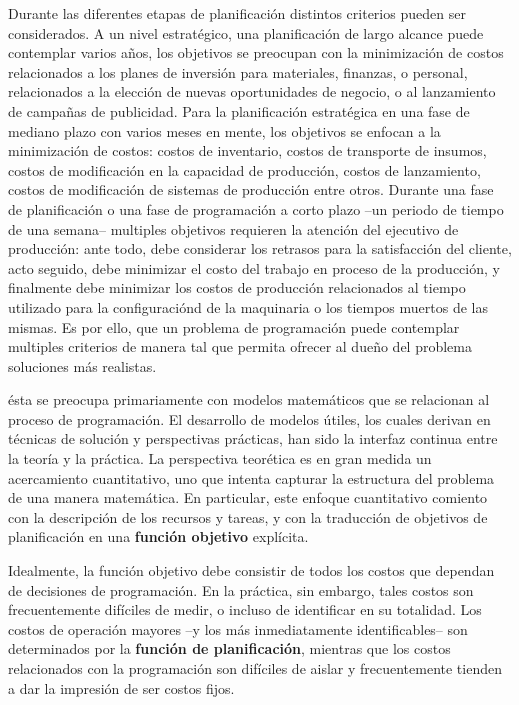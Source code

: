\documentclass[draft,12pt,headsepline,footsepline,paper=letter]{scrreprt}
\begin{document}
Durante las diferentes etapas de planificación distintos criterios pueden ser considerados. A un nivel estratégico, una planificación de largo alcance puede contemplar varios años, los objetivos se preocupan con la minimización de costos relacionados a los planes de inversión para materiales, finanzas, o personal, relacionados a la elección de nuevas oportunidades de negocio, o al lanzamiento de campañas de publicidad. Para la planificación estratégica en una fase de mediano plazo con varios meses en mente, los objetivos se enfocan a la minimización de costos: costos de inventario, costos de transporte de insumos, costos de modificación en la capacidad de producción, costos de lanzamiento, costos de modificación de sistemas de producción entre otros. Durante una fase de planificación o una fase de programación a corto plazo –un periodo de tiempo de una semana– multiples objetivos requieren la atención del ejecutivo de producción: ante todo, debe considerar los retrasos para la satisfacción del cliente, acto seguido, debe minimizar el costo del trabajo en proceso de la producción, y finalmente debe minimizar los costos de producción relacionados al tiempo utilizado para la configuraciónd de la maquinaria o los tiempos muertos de las mismas. Es por ello, que un problema de programación puede contemplar multiples criterios de manera tal que permita ofrecer al dueño del problema soluciones más realistas\citep[p.~1]{TKindt2002}.

ésta se preocupa primariamente con modelos matemáticos que se relacionan al proceso de programación. El desarrollo de modelos útiles, los cuales derivan en técnicas de solución y perspectivas prácticas, han sido la interfaz continua entre la teoría y la práctica. 
%
La perspectiva teorética es en gran medida un acercamiento cuantitativo, uno que intenta capturar la estructura del problema de una manera matemática.
%
En particular, este enfoque cuantitativo comiento con la descripción de los recursos y tareas, y con la traducción de objetivos de planificación en una \textbf{función objetivo} explícita.

Idealmente, la función objetivo debe consistir de todos los costos que dependan de decisiones de programación. En la práctica, sin embargo, tales costos son frecuentemente difíciles de medir, o incluso de identificar en su totalidad. Los costos de operación mayores –y los más inmediatamente identificables– son determinados por la \textbf{función de planificación}, mientras que los costos relacionados con la programación son difíciles de aislar y frecuentemente tienden a dar la impresión de ser costos fijos.
\end{document}
